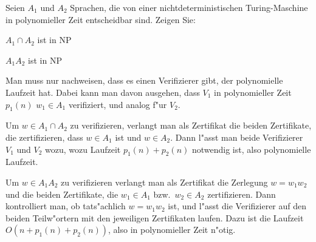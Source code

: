Seien $A_1$ und $A_2$ Sprachen, die von einer nichtdeterministischen
Turing-Maschine in polynomieller Zeit entscheidbar sind. Zeigen Sie:
\begin{teilaufgaben}
\item $A_1\cap A_2$ ist in NP
\item $A_1A_2$ ist in NP
\end{teilaufgaben}

\begin{loesung}
Man muss nur nachweisen, dass es einen Verifizierer gibt, der polynomielle
Laufzeit hat. Dabei kann man davon ausgehen, dass $V_1$ in polynomieller
Zeit $p_1(n)$ $w_1\in A_1$ verifiziert, und analog f"ur $V_2$.
\begin{teilaufgaben}
\item
Um $w\in A_1\cap A_2$ zu verifizieren, verlangt man als Zertifikat
die beiden Zertifikate, die zertifizieren, dass $w\in  A_1$
ist und $w\in A_2$. Dann l"asst man beide Verifizierer
$V_1$ und $V_2$ wozu, wozu Laufzeit $p_1(n)+p_2(n)$ notwendig ist,
also polynomielle Laufzeit.
\item
Um $w\in A_1A_2$ zu verifizieren verlangt man als Zertifikat
die Zerlegung $w=w_1w_2$ und die beiden Zertifikate, die 
$w_1\in A_1$ bzw.~$w_2\in A_2$ zertifizieren. Dann kontrolliert
man, ob tats"achlich $w=w_1w_2$ ist, und  l"asst
die Verifizierer auf den beiden Teilw"ortern mit den
jeweiligen Zertifikaten laufen.
Dazu ist die Laufzeit
$O(n + p_1(n) + p_2(n))$, also in polynomieller Zeit n"otig.
\end{teilaufgaben}
\end{loesung}
